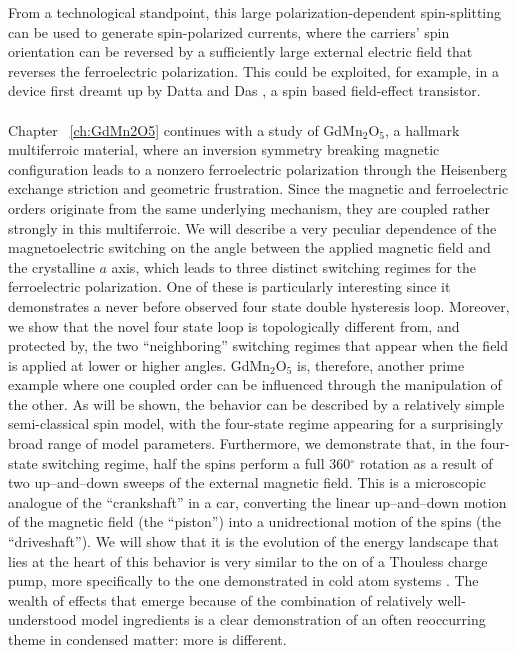 From a technological standpoint, this large polarization-dependent spin-splitting can be used to generate spin-polarized currents, where the carriers' spin orientation can be reversed by a sufficiently large external electric field that reverses the ferroelectric polarization.
This could be exploited, for example, in a device first dreamt up by Datta and Das \cite{Datta1990}, a spin based field-effect transistor.
\\\\
Chapter ~\ref{ch:GdMn2O5} continues with a study of GdMn$_2$O$_5$, a hallmark multiferroic material, where an inversion symmetry breaking magnetic configuration leads to a nonzero ferroelectric polarization through the Heisenberg exchange striction and geometric frustration.
Since the magnetic and ferroelectric orders originate from the same underlying mechanism, they are coupled rather strongly in this multiferroic.
We will describe a very peculiar dependence of the magnetoelectric switching on the angle between the applied magnetic field and the crystalline $a$ axis, which leads to three distinct switching regimes for the ferroelectric polarization.
One of these is particularly interesting since it demonstrates a never before observed four state double hysteresis loop.
Moreover, we show that the novel four state loop is topologically different from, and protected by, the two ``neighboring'' switching regimes that appear when the field is applied at lower or higher angles.
GdMn$_2$O$_5$ is, therefore, another prime example where one coupled order can be influenced through the manipulation of the other.
As will be shown, the behavior can be described by a relatively simple semi-classical spin model, with the four-state regime appearing for a surprisingly broad range of model parameters.
Furthermore, we demonstrate that, in the four-state switching regime, half the spins perform a full 360$^\circ$ rotation as a result of two up--and--down sweeps of the external magnetic field.
This is a microscopic analogue of the ``crankshaft'' in a car, converting the linear up--and--down motion of the magnetic field (the ``piston'') into a unidrectional motion of the spins (the ``driveshaft'').
We will show that it is the evolution of the energy landscape that lies at the heart of this behavior is very similar to the on of a Thouless charge pump, more specifically to the one demonstrated in cold atom systems \cite{Lohse16}.
The wealth of effects that emerge because of the combination of relatively well-understood model ingredients is a clear demonstration of an often reoccurring theme in condensed matter: more is different.  
